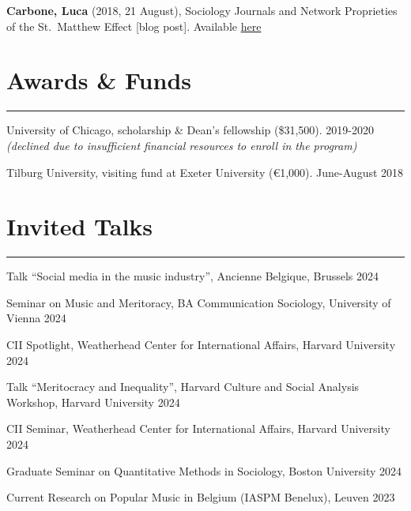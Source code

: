 \documentclass[12pt,]{article}
\begin{document}
\textbf{Carbone, Luca} (2018, 21 August), Sociology Journals and Network
Proprieties of the St.~Matthew Effect {[}blog post{]}. Available
\href{https://economicsociology.org/2018/08/21/sociological-journals-and-network-proprieties-of-the-st-matthew-effect/}{here}

\hypertarget{awards-funds}{%
\section{Awards \& Funds}\label{awards-funds}}

\vspace{-10pt}
\rule{1\linewidth}{\linethickness}

University of Chicago, scholarship \& Dean's fellowship (\$31,500).
\hfill \begingroup\small 2019-2020 \endgroup\\
\emph{(declined due to insufficient financial resources to enroll in the
program)}

Tilburg University, visiting fund at Exeter University (€1,000).
\hfill \begingroup\small June-August 2018\endgroup

\hypertarget{invited-talks}{%
\section{Invited Talks}\label{invited-talks}}

\vspace{-10pt}
\rule{1\linewidth}{\linethickness}

Talk ``Social media in the music industry'', Ancienne Belgique, Brussels
\hfill \begingroup\small 2024\endgroup

Seminar on Music and Meritoracy, BA Communication Sociology, University
of Vienna \hfill \begingroup\small 2024\endgroup

CII Spotlight, Weatherhead Center for International Affairs, Harvard
University \hfill \begingroup\small 2024\endgroup

Talk ``Meritocracy and Inequality'', Harvard Culture and Social Analysis
Workshop, Harvard University \hfill \begingroup\small 2024\endgroup

CII Seminar, Weatherhead Center for International Affairs, Harvard
University \hfill \begingroup\small 2024\endgroup

Graduate Seminar on Quantitative Methods in Sociology, Boston University
\hfill \begingroup\small 2024\endgroup

Current Research on Popular Music in Belgium (IASPM Benelux), Leuven
\hfill \begingroup\small 2023\endgroup
\end{document}
